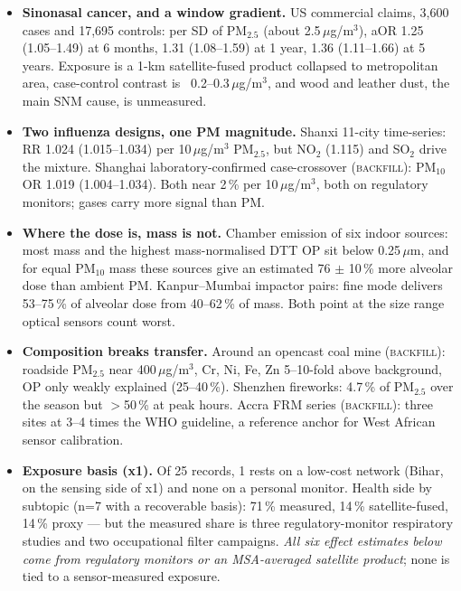 \documentclass[10pt]{article}
\begin{document}
\footnotesize
\begin{itemize}

\item \textbf{Sinonasal cancer, and a window gradient.} US commercial claims, 3,600 cases and 17,695 controls: per SD of PM$_{2.5}$ (about 2.5\,$\mu$g/m$^3$), aOR 1.25 (1.05--1.49) at 6 months, 1.31 (1.08--1.59) at 1 year, 1.36 (1.11--1.66) at 5 years. Exposure is a 1-km satellite-fused product collapsed to metropolitan area, case-control contrast is ~0.2--0.3\,$\mu$g/m$^3$, and wood and leather dust, the main SNM cause, is unmeasured.

\item \textbf{Two influenza designs, one PM magnitude.} Shanxi 11-city time-series: RR 1.024 (1.015--1.034) per 10\,$\mu$g/m$^3$ PM$_{2.5}$, but NO$_2$ (1.115) and SO$_2$ drive the mixture. Shanghai laboratory-confirmed case-crossover (\textsc{backfill}): PM$_{10}$ OR 1.019 (1.004--1.034). Both near 2\,\% per 10\,$\mu$g/m$^3$, both on regulatory monitors; gases carry more signal than PM.

\item \textbf{Where the dose is, mass is not.} Chamber emission of six indoor sources: most mass and the highest mass-normalised DTT OP sit below 0.25\,$\mu$m, and for equal PM$_{10}$ mass these sources give an estimated 76 $\pm$ 10\,\% more alveolar dose than ambient PM. Kanpur--Mumbai impactor pairs: fine mode delivers 53--75\,\% of alveolar dose from 40--62\,\% of mass. Both point at the size range optical sensors count worst.

\item \textbf{Composition breaks transfer.} Around an opencast coal mine (\textsc{backfill}): roadside PM$_{2.5}$ near 400\,$\mu$g/m$^3$, Cr, Ni, Fe, Zn 5--10-fold above background, OP only weakly explained (25--40\,\%). Shenzhen fireworks: 4.7\,\% of PM$_{2.5}$ over the season but $>$50\,\% at peak hours. Accra FRM series (\textsc{backfill}): three sites at 3--4 times the WHO guideline, a reference anchor for West African sensor calibration.

\item \textbf{Exposure basis (x1).} Of 25 records, 1 rests on a low-cost network (Bihar, on the sensing side of x1) and none on a personal monitor. Health side by subtopic (n=7 with a recoverable basis): 71\,\% measured, 14\,\% satellite-fused, 14\,\% proxy --- but the measured share is three regulatory-monitor respiratory studies and two occupational filter campaigns. \emph{All six effect estimates below come from regulatory monitors or an MSA-averaged satellite product}; none is tied to a sensor-measured exposure.

\end{itemize}
\end{document}
